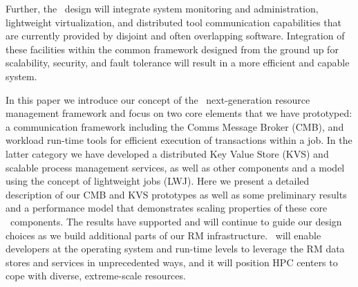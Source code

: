 Further, the \flux\ design will integrate system monitoring and
administration, lightweight virtualization, 
and distributed tool communication capabilities 
that are currently provided by disjoint
and often overlapping software. 
Integration of these facilities within the common framework
designed from the ground up for scalability, security,
and fault tolerance will result in a more efficient
and capable system.

In this paper we introduce our concept of the \flux\ next-generation
resource management framework
and focus on two core elements that we have prototyped: a
communication framework including the Comms Message Broker (CMB), and
workload
run-time tools for efficient execution of transactions within a job. In the
latter category we have developed a distributed Key Value Store (KVS) and
scalable process management services, as well as other components and a
model
using the concept of lightweight jobs (LWJ).
Here we present a detailed description of our CMB and KVS prototypes
as well as some preliminary results and a performance model that
demonstrates scaling properties of these core \flux\ components.
The results have supported and will continue to guide our design
choices as we build additional parts of our RM infrastructure.
\flux\ will enable developers at the operating system and
run-time levels to leverage the RM data stores and services in
unprecedented ways, and it will position HPC centers to cope
with diverse, extreme-scale resources.

\ifcomments
{}

\ifcomments
{}

\ifcomments
{}

\ifcomments
{}

